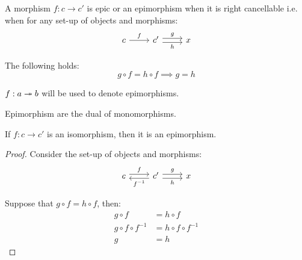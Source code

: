 \begin{definition}
  A morphism $f:c\to c'$ is epic or an epimorphism when it is right cancellable
  \parencite{lane:working_mathematician} i.e. when for any set-up of objects and
  morphisms:
  \[\begin{tikzcd}[ampersand replacement=\&]
    c \& {c'} \& x
    \arrow["h"', shift right=1, from=1-2, to=1-3]
    \arrow["f", from=1-1, to=1-2]
    \arrow["g", shift left=1, from=1-2, to=1-3]
  \end{tikzcd}\]

  The following holds:
  \[g \circ f = h \circ f \implies g = h\]
\end{definition}

\begin{remark}
  $f:a\twoheadrightarrow b$ will be used to denote epimorphisms.
\end{remark}

\begin{remark}
  Epimorphism are the dual of monomorphisms.
\end{remark}

\begin{theorem}
  If $f:c\to c'$ is an isomorphism, then it is an epimorphism.

  \begin{proof}
    Consider the set-up of objects and morphisms:
    \[\begin{tikzcd}[ampersand replacement=\&]
      c \& {c'} \& x
      \arrow["f", shift left=1, from=1-1, to=1-2]
      \arrow["{f^{-1}}", shift left=1, from=1-2, to=1-1]
      \arrow["g", shift left=1, from=1-2, to=1-3]
      \arrow["h"', shift right=1, from=1-2, to=1-3]
    \end{tikzcd}\]

    Suppose that $g \circ f = h \circ f$, then:
    \[
      \begin{aligned}
        g \circ f &= h \circ f\\
        g \circ f \circ f^{-1} &= h \circ f \circ f^{-1}\\
        g &= h
      \end{aligned}
    \]
  \end{proof}
\end{theorem}